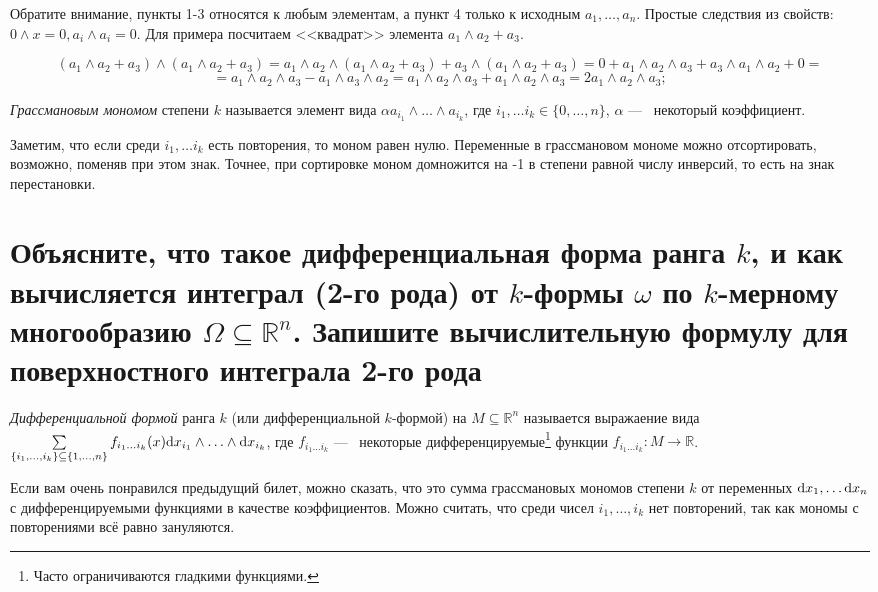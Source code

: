 \documentclass{article}
\begin{document}
	Обратите внимание, пункты 1-3 относятся к любым элементам, а пункт 4 только к исходным $a_1, \ldots, a_n$. Простые следствия из свойств: $0 \land x = 0, a_i \land a_i = 0$. Для примера посчитаем <<квадрат>> элемента $a_1 \land a_2 + a_3$.
	
	\[ (a_1 \land a_2 + a_3) \land (a_1 \land a_2 + a_3) = a_1 \land a_2 \land (a_1 \land a_2 + a_3) + a_3 \land (a_1 \land a_2 + a_3) = 0 + a_1 \land a_2 \land a_3 + a_3 \land a_1 \land a_2 + 0 = \] \[ = a_1 \land a_2 \land a_3  - a_1 \land a_3 \land a_2 = a_1 \land a_2 \land a_3 + a_1 \land a_2 \land a_3 = 2a_1 \land a_2 \land a_3;\]

	\begin{definition}
		\textit{Грассмановым мономом} степени $k$ называется элемент вида $\alpha a_{i_1} \land \ldots \land a_{i_k}$, где $ i_1, \ldots i_k \in \{0, \ldots, n \}$, $\alpha$ ---~ некоторый коэффициент.
	\end{definition}

	Заметим, что если среди $i_1, \ldots i_k$ есть повторения, то моном равен нулю. Переменные в грассмановом мономе можно отсортировать, возможно, поменяв при этом знак. Точнее, при сортировке моном домножится на -1 в степени равной числу инверсий, то есть на знак перестановки.

	\section{Объясните, что такое дифференциальная форма ранга $k$, и как вычисляется интеграл (2-го рода) от $k$-формы $\omega$ по $k$-мерному многообразию $\Omega \subseteq \mathbb{R}^n$. Запишите вычислительную формулу для поверхностного интеграла 2-го рода}

	\begin{definition}
		\textit{Дифференциальной формой} ранга $k$ (или дифференциальной $k$-формой) на $M \subseteq \mathbb{R}^n$ называется выражаение вида $\sum\limits_{\{i_1, \ldots, i_k\} \subseteq \{1, \ldots, n\}} f_{i_1 \ldots i_k}(x)\mathrm{d} x_{i_1} \land \ldots \land \mathrm{d} x_{i_k}$, где $f_{i_1\ldots i_k}$ ---~ некоторые дифференцируемые\footnote{Часто ограничиваются гладкими функциями.} функции $f_{i_1\ldots i_k}:M \to \mathbb{R}$.
	\end{definition}

	Если вам очень понравился предыдущий билет, можно сказать, что это сумма грассмановых мономов степени $k$ от переменных $\mathrm{d} x_1, \ldots \mathrm{d} x_n$ с дифференцируемыми функциями в качестве коэффициентов. Можно считать, что среди чисел $i_1, \ldots, i_k$ нет повторений, так как мономы с повторениями всё равно зануляются.
\end{document}
